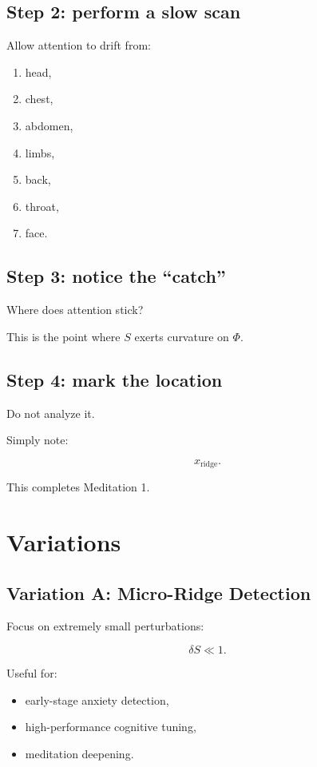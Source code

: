 \documentclass[12pt]{article}
\begin{document}
\subsection*{Step 2: perform a slow scan}
Allow attention to drift from:

\begin{enumerate}
    \item head,
    \item chest,
    \item abdomen,
    \item limbs,
    \item back,
    \item throat,
    \item face.
\end{enumerate}

\subsection*{Step 3: notice the “catch”}

Where does attention stick?

This is the point where $S$ exerts curvature on $\Phi$.

\subsection*{Step 4: mark the location}

Do not analyze it.

Simply note:

\[
x_{\text{ridge}}.
\]

This completes Meditation 1.

\section{Variations}

\subsection{Variation A: Micro-Ridge Detection}

Focus on extremely small perturbations:

\[
\delta S \ll 1.
\]

Useful for:

\begin{itemize}
    \item early-stage anxiety detection,
    \item high-performance cognitive tuning,
    \item meditation deepening.
\end{itemize}
\end{document}
